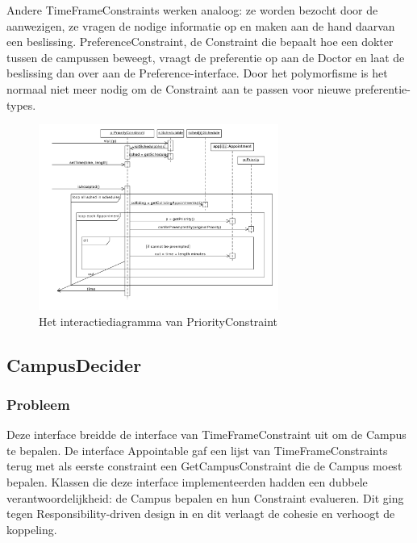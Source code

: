Andere TimeFrameConstraints werken analoog: ze worden bezocht door de aanwezigen, ze vragen de nodige informatie op en maken aan de hand daarvan een beslissing. 
PreferenceConstraint, de Constraint die bepaalt hoe een dokter tussen de campussen beweegt, vraagt de preferentie op aan de Doctor en laat de beslissing dan over aan de Preference-interface. 
Door het polymorfisme is het normaal niet meer nodig om de Constraint aan te passen voor nieuwe preferentie-types.

\begin{figure}
  \begin{center}
    \includegraphics[width=0.7\textwidth]{./exported/interaction/PriorityConstraint.pdf}
  \end{center}
\vspace{-1cm}
  \caption{Het interactiediagramma van PriorityConstraint\label{fig:PriorityConstraint}}
\end{figure} 


\subsection{CampusDecider}
\subsubsection{Probleem}
Deze interface breidde de interface van TimeFrameConstraint uit om de Campus te bepalen. 
De interface Appointable gaf een lijst van TimeFrameConstraints terug met als eerste constraint een GetCampusConstraint die de Campus moest bepalen. 
Klassen die deze interface implementeerden hadden een dubbele verantwoordelijkheid: 
de Campus bepalen en hun Constraint evalueren. Dit ging tegen Responsibility-driven design in en dit verlaagt de cohesie en verhoogt de koppeling.

